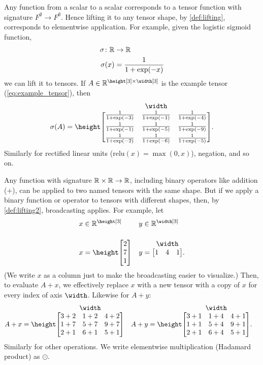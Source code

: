 Any function from a scalar to a scalar corresponds to a tensor function with signature $F^{\emptyset} \rightarrow F^{\emptyset}$. 
Hence lifting it to any tensor shape, by \cref{def:lifting}, corresponds to elementwise application. 
For example, given the logistic sigmoid function,
\begin{align*}
  \sigma \colon \mathbb{R} &\rightarrow \mathbb{R} \\
  \sigma(x) &= \frac{1}{1+\exp(-x)}
\end{align*}  
we can lift it to tensors. If $A \in \reals^{\height[3] \times \width[3]}$ is the example tensor (\ref{eq:example_tensor}), then
\begin{equation*}
\sigma(A) = \nmatrix{\height}{\width}{
  \frac1{1+\exp(-3)} & \frac1{1+\exp(-1)} & \frac1{1+\exp(-4)} \\[1ex]
  \frac1{1+\exp(-1)} & \frac1{1+\exp(-5)} & \frac1{1+\exp(-9)} \\[1ex]
  \frac1{1+\exp(-2)} & \frac1{1+\exp(-6)} & \frac1{1+\exp(-5)}
}.
\end{equation*}
Similarly for rectified linear units ($\text{relu}(x) = \max(0, x)$), negation, and so on.

Any function with signature $\mathbb{R} \times \mathbb{R} \rightarrow \mathbb{R}$, including binary operators like addition ($\mathord+$), can be applied to two named tensors with the same shape.
But if we apply a binary function or operator to tensors with different shapes, then, by \cref{def:lifting2}, broadcasting applies. For example, let
\begin{align*}
  x &\in \reals^{\height[3]} & y &\in \reals^{\width[3]} \\
  x &= \nmatrix{\height}{}{
    2 \\ 7 \\ 1
  } & 
  y &= \nmatrix{}{\width}{
    1 & 4 & 1
  }.
\end{align*}
(We write $x$ as a column just to make the broadcasting easier to visualize.) Then, to evaluate $A+x$, we effectively replace $x$ with a new tensor with a copy of $x$ for every index of axis $\width$. Likewise for $A+y$:
\begin{align*}
A + x &= \nmatrix{\height}{\width}{
  3+2 & 1+2 & 4+2 \\
  1+7 & 5+7 & 9+7 \\
  2+1 & 6+1 & 5+1
} &
A + y &= \nmatrix{\height}{\width}{
  3+1 & 1+4 & 4+1 \\
  1+1 & 5+4 & 9+1 \\
  2+1 & 6+4 & 5+1
}.
\end{align*}
Similarly for other operations. We write elementwise multiplication (Hadamard product) as $\odot$.

